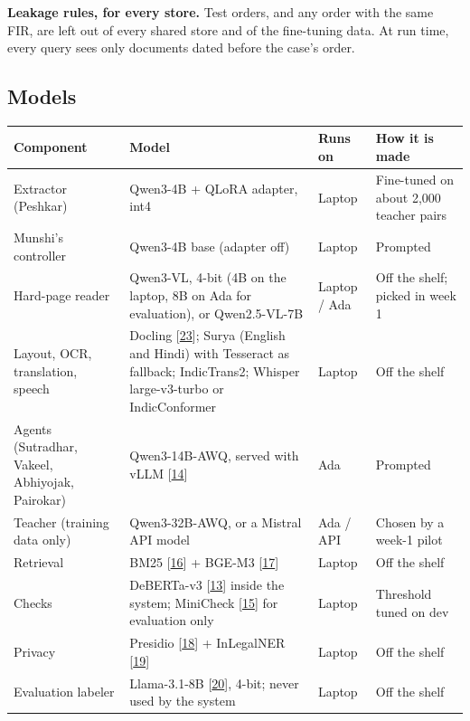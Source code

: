 \documentclass[10pt,a4paper]{article}
\begin{document}
\textbf{Leakage rules, for every store.} Test orders, and any order with the same FIR, are left out of every shared store and of the fine-tuning data. At run time, every query sees only documents dated before the case's order.

\subsection{Models}

{\small
\begin{xltabular}{\linewidth}{@{}>{\raggedright\arraybackslash{}\hsize}X>{\raggedright\arraybackslash{}\hsize}X>{\raggedright\arraybackslash{}\hsize}X>{\raggedright\arraybackslash{}\hsize}X@{}}
\toprule
\textbf{Component} & \textbf{Model} & \textbf{Runs on} & \textbf{How it is made} \\
\midrule
\endhead
Extractor (Peshkar) & Qwen3-4B + QLoRA adapter, int4 & Laptop & Fine-tuned on about 2,000 teacher pairs \\
Munshi's controller & Qwen3-4B base (adapter off) & Laptop & Prompted \\
Hard-page reader & Qwen3-VL, 4-bit (4B on the laptop, 8B on Ada for evaluation), or Qwen2.5-VL-7B & Laptop / Ada & Off the shelf; picked in week 1 \\
Layout, OCR, translation, speech & Docling [\href{https://arxiv.org/abs/2408.09869}{23}]; Surya (English and Hindi) with Tesseract as fallback; IndicTrans2; Whisper large-v3-turbo or IndicConformer & Laptop & Off the shelf \\
Agents (Sutradhar, Vakeel, Abhiyojak, Pairokar) & Qwen3-14B-AWQ, served with vLLM [\href{https://arxiv.org/abs/2309.06180}{14}] & Ada & Prompted \\
Teacher (training data only) & Qwen3-32B-AWQ, or a Mistral API model & Ada / API & Chosen by a week-1 pilot \\
Retrieval & BM25 [\href{https://doi.org/10.1561/1500000019}{16}] + BGE-M3 [\href{https://arxiv.org/abs/2402.03216}{17}] & Laptop & Off the shelf \\
Checks & DeBERTa-v3 [\href{https://arxiv.org/abs/2111.09543}{13}] inside the system; MiniCheck [\href{https://aclanthology.org/2024.emnlp-main.499/}{15}] for evaluation only & Laptop & Threshold tuned on dev \\
Privacy & Presidio [\href{https://github.com/microsoft/presidio}{18}] + InLegalNER [\href{https://arxiv.org/abs/2211.03442}{19}] & Laptop & Off the shelf \\
Evaluation labeler & Llama-3.1-8B [\href{https://arxiv.org/abs/2407.21783}{20}], 4-bit; never used by the system & Laptop & Off the shelf \\
\bottomrule
\end{xltabular}}
\end{document}
